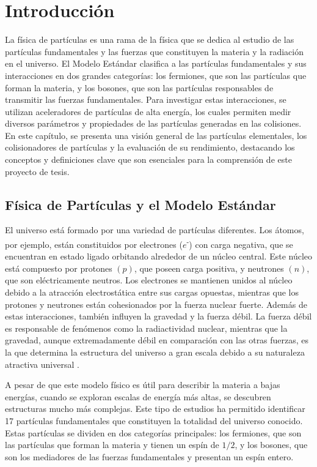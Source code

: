 \chapter{Introducción}
\label{ch1}

La física de partículas es una rama de la física que se dedica al estudio de las partículas fundamentales y las fuerzas que constituyen la materia y la radiación en el universo. El Modelo Estándar clasifica a las partículas fundamentales y sus interacciones en dos grandes categorías: los fermiones, que son las partículas que forman la materia, y los bosones, que son las partículas responsables de transmitir las fuerzas fundamentales. Para investigar estas interacciones, se utilizan aceleradores de partículas de alta energía, los cuales permiten medir diversos parámetros y propiedades de las partículas generadas en las colisiones. En este capítulo, se presenta una visión general de las partículas elementales, los colisionadores de partículas y la evaluación de su rendimiento, destacando los conceptos y definiciones clave que son esenciales para la comprensión de este proyecto de tesis.

\section{Física de Partículas y el Modelo Estándar}

El universo está formado por una variedad de partículas diferentes. Los átomos, por ejemplo, están constituidos por electrones ($e$\textsuperscript{-}) con carga negativa, que se encuentran en estado ligado orbitando alrededor de un núcleo central. Este núcleo está compuesto por protones $(p)$, que poseen carga positiva, y neutrones $(n)$, que son eléctricamente neutros. Los electrones se mantienen unidos al núcleo debido a la atracción electrostática entre sus cargas opuestas, mientras que los protones y neutrones están cohesionados por la fuerza nuclear fuerte. Además de estas interacciones, también influyen la gravedad y la fuerza débil. La fuerza débil es responsable de fenómenos como la radiactividad nuclear, mientras que la gravedad, aunque extremadamente débil en comparación con las otras fuerzas, es la que determina la estructura del universo a gran escala debido a su naturaleza atractiva universal \cite{thomson_2013}. 

A pesar de que este modelo físico es útil para describir la materia a bajas energías, cuando se exploran escalas de energía más altas, se descubren estructuras mucho más complejas. Este tipo de estudios ha permitido identificar 17 partículas fundamentales que constituyen la totalidad del universo conocido. Estas partículas se dividen en dos categorías principales: los fermiones, que son las partículas que forman la materia y tienen un espín de $1/2$, y los bosones, que son los mediadores de las fuerzas fundamentales y presentan un espín entero.

